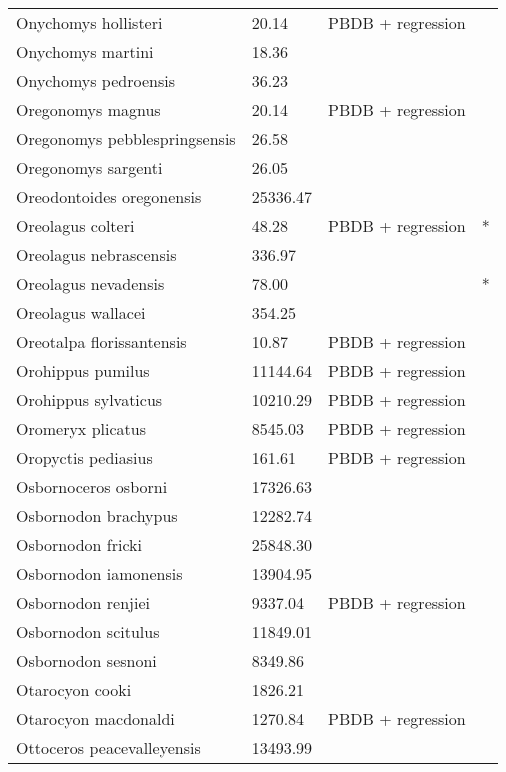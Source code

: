 \documentclass{article}
\begin{document}
\begin{center}
\begin{longtable}{p{} p{} p{} p{}}
    Onychomys hollisteri & 20.14 & PBDB + regression &  \\ 
    Onychomys martini & 18.36 & \cite{Tomiya2013} &  \\ 
    Onychomys pedroensis & 36.23 & \cite{Tomiya2013} &  \\ 
    Oregonomys magnus & 20.14 & PBDB + regression &  \\ 
    Oregonomys pebblespringsensis & 26.58 & \cite{Tomiya2013} &  \\ 
    Oregonomys sargenti & 26.05 & \cite{Tomiya2013} &  \\ 
    Oreodontoides oregonensis & 25336.47 & \cite{Tomiya2013} &  \\ 
    Oreolagus colteri & 48.28 & PBDB + regression & * \\ 
    Oreolagus nebrascensis & 336.97 & \cite{Tomiya2013} &  \\ 
    Oreolagus nevadensis & 78.00 & \cite{McKenna2011} & * \\ 
    Oreolagus wallacei & 354.25 & \cite{Tomiya2013} &  \\ 
    Oreotalpa florissantensis & 10.87 & PBDB + regression &  \\ 
    Orohippus pumilus & 11144.64 & PBDB + regression &  \\ 
    Orohippus sylvaticus & 10210.29 & PBDB + regression &  \\ 
    Oromeryx plicatus & 8545.03 & PBDB + regression &  \\ 
    Oropyctis pediasius & 161.61 & PBDB + regression &  \\ 
    Osbornoceros osborni & 17326.63 & \cite{Tomiya2013} &  \\ 
    Osbornodon brachypus & 12282.74 & \cite{Chester2012} &  \\ 
    Osbornodon fricki & 25848.30 & \cite{Tomiya2013} &  \\ 
    Osbornodon iamonensis & 13904.95 & \cite{Tomiya2013} &  \\ 
    Osbornodon renjiei & 9337.04 & PBDB + regression &  \\ 
    Osbornodon scitulus & 11849.01 & \cite{Tomiya2013} &  \\ 
    Osbornodon sesnoni & 8349.86 & \cite{Tomiya2013} &  \\ 
    Otarocyon cooki & 1826.21 & \cite{Tomiya2013} &  \\ 
    Otarocyon macdonaldi & 1270.84 & PBDB + regression &  \\ 
    Ottoceros peacevalleyensis & 13493.99 & \cite{Tomiya2013} &  \\ 

\end{longtable}
\end{center}
\end{document}
